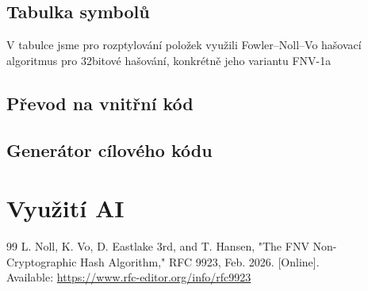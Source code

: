 \documentclass{article}
\begin{document}
        \subsection{Tabulka symbolů}
            V tabulce jsme pro rozptylování položek využili Fowler–Noll–Vo hašovací algoritmus pro 32bitové hašování, konkrétně jeho variantu FNV-1a \cite{FNV-1a} %

        \subsection{Převod na vnitřní kód}
            
        \subsection{Generátor cílového kódu}
            

    \newpage


    \section{Využití AI}
        

    \newpage

    
    \def \refname {Převzaté zdroje}
    \begin{thebibliography}{99}
         L. Noll, K. Vo, D. Eastlake 3rd, and T. Hansen, "The FNV Non-Cryptographic Hash Algorithm," RFC 9923, Feb. 2026. [Online].\\
        Available: \mbox{\url{https://www.rfc-editor.org/info/rfc9923}}
    \end{thebibliography}
\end{document}
